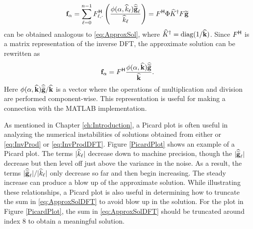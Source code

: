 \begin{equation}
\mathbf{f}_\alpha = \sum_{\ell = 0}^{n-1} {F}^\mathsf{H}_{\ell,\cdot}\left(\frac{\phi(\alpha,\widehat{k}_\ell)\widehat{\widetilde{\mathbf{g}}}_\ell}{\widehat{k}_\ell}\right) = {F}^\mathsf{H}\Phi\widehat{K}^\dagger F\widetilde{\mathbf{g}}
\label{eq:ApproxSolDFT}
\end{equation}
can be obtained analogous to \eqref{eq:ApproxSol}, where $\widehat{K}^\dagger = \operatorname{diag}(1/\widehat{\mathbf{k}})$.
Since ${F}^\mathsf{H}$ is a matrix representation of the inverse DFT, the approximate solution can be rewritten as
\[\mathbf{f}_\alpha = {F}^\mathsf{H} \frac{\phi(\alpha,\widehat{\mathbf{k}})\widehat{\widetilde{\mathbf{g}}}}{\widehat{\mathbf{k}}}.\]
Here $\phi(\alpha,\widehat{\mathbf{k}})\widehat{\widetilde{\mathbf{g}}}/{\widehat{\mathbf{k}}}$ is a vector where the operations of multiplication and division are performed component-wise. This representation is useful for making a connection with the MATLAB implementation. \par
As mentioned in Chapter \ref{ch:Introduction}, a Picard plot is often useful in analyzing the numerical instabilities of solutions obtained from either or \eqref{eq:InvProd} or \eqref{eq:InvProdDFT}. Figure \ref{PicardPlot} shows an example of a Picard plot. The terms $|\widehat{k}_\ell|$ decrease down to machine precision, though the $|\widehat{\widetilde{\mathbf{g}}}_\ell|$ decrease but then level off just above the variance in the noise. As a result, the terms $|\widehat{\widetilde{\mathbf{g}}}_\ell|/|\widehat{k}_\ell|$ only decrease so far and then begin increasing. The steady increase can produce a blow up of the approximate solution. While illustrating these relationships, a Picard plot is also useful in determining how to truncate the sum in \eqref{eq:ApproxSolDFT} to avoid blow up in the solution. For the plot in Figure \ref{PicardPlot}, the sum in \eqref{eq:ApproxSolDFT} should be truncated around index 8 to obtain a meaningful solution. \par 

